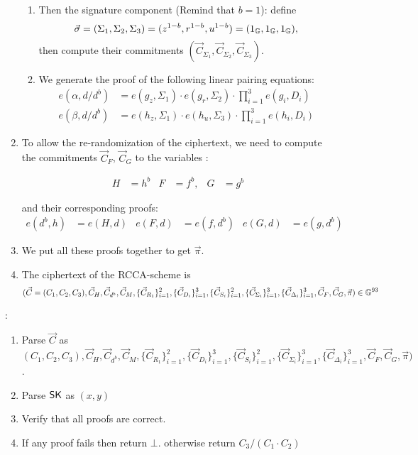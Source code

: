 \begin{description}
\begin{enumerate}
\begin{enumerate}
    \item Then the signature component (Remind that $b = 1$): define
      $$\vec{\sigma}  = (\Sigma_1, \Sigma_2, \Sigma_3) = (z^{1-b},r^{1-b},u^{1-b}) = (1_{\mathbb{G}}, 1_{\mathbb{G}}, 1_{\mathbb{G}}),$$
      then compute their commitments $(\vec{C}_{\Sigma_1}, \vec{C}_{\Sigma_2}, \vec{C}_{\Sigma_3})$.
    \item We generate the proof of the following linear pairing equations:
      \begin{align} 
        e(\alpha, d/\boxed{d^b}) &= e(g_z, \boxed{\Sigma_1}) \cdot e(g_r, \boxed{\Sigma_2}) \cdot \prod_{i=1}^3 e(g_i, \boxed{D_i}) \tag{11}\\
        e(\beta, d/\boxed{d^b}) &= e(h_z, \boxed{\Sigma_1}) \cdot e(h_u, \boxed{\Sigma_3}) \cdot \prod_{i=1}^3 e(h_i, \boxed{D_i}) \tag{12}
      \end{align}

    \end{enumerate}

  \item To allow the re-randomization of the ciphertext, we need to compute the commitments $\vec{C}_F$, $\vec{C}_G$ to the variables :

    \begin{align*}
    H &= h^b & F &= f^b, & G&=g^b
    \end{align*}

    and their corresponding proofs:
    \begin{align}
      e(\boxed{d^b}, h) &= e(\boxed{H},d) & e(\boxed{F},d) &= e(f,\boxed{d^b}) & e(\boxed{G}, d) &= e(g, \boxed{d^b})\tag{13, 14, 15}
    \end{align}

    
  \item We put all these proofs together to get $\vec{\pi}$.
  \item The ciphertext of the RCCA-scheme is
    $$(\vec{C} = (C_1, C_2, C_3), \vec{C}_{H}, \vec{C}_{d^b}, \vec{C}_{M}, \{\vec{C}_{R_1}\}_{i= 1}^2, \{\vec{C}_{D_i}\}_{i = 1}^3, \{\vec{C}_{S_i}\}_{i = 1}^2, \{\vec{C}_{\Sigma_i}\}_{i = 1}^3,\{\vec{C}_{\Delta_i}\}_{i=1}^3, \vec{C}_F, \vec{C}_G, \vec{\pi}) \in \mathbb{G}^{93}$$
    
  \end{enumerate}

\item[\boldmath{$RCCA1.\Dec(\PK,\SK, \vec{C})$}]:
  \begin{enumerate}
  \item Parse $\vec{C}$ as $(C_1, C_2, C_3), \vec{C}_{H}, \vec{C}_{d^b}, \vec{C}_{M}, \{\vec{C}_{R_1}\}_{i= 1}^2, \{\vec{C}_{D_i}\}_{i = 1}^3, \{\vec{C}_{S_i}\}_{i = 1}^2, \{\vec{C}_{\Sigma_i}\}_{i = 1}^3,\{\vec{C}_{\Delta_i}\}_{i=1}^3, \vec{C}_F, \vec{C}_G, \vec{\pi})$.
  \item Parse $\mathsf{SK}$ as $(x,y)$
  \item Verify that all proofs are correct.
  \item If any proof fails then return $\bot$. otherwise return $C_3/(C_1 \cdot C_2)$ 
  \end{enumerate}
  

\end{description}
